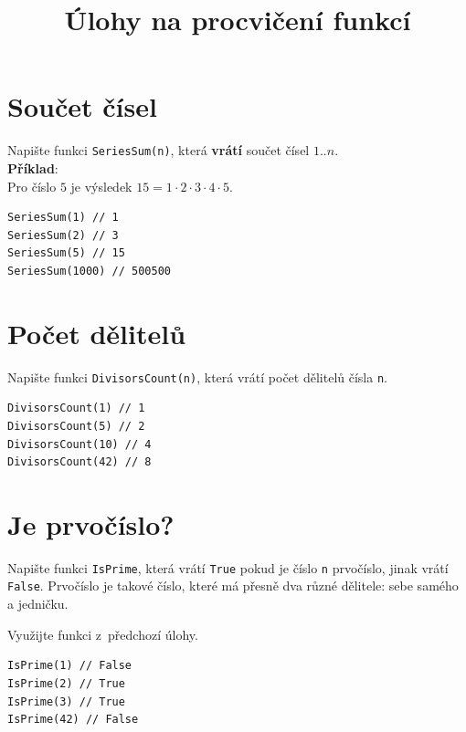 \documentclass[12pt,a4paper]{article}
\begin{document}
\pagestyle{empty}
\title{Úlohy na procvičení funkcí}
\date{\vspace{-10ex}}
\setlength{\droptitle}{-6em}
\maketitle

\setlength\parindent{0pt}

\begin{multicols}{2}

\section{Součet čísel}

Napište funkci \texttt{SeriesSum(n)}, která \textbf{vrátí} součet čísel
$1..n$.\\

\textbf{Příklad}:\\
Pro číslo $5$ je výsledek $15 = 1 \cdot 2 \cdot 3 \cdot 4 \cdot 5$.

\begin{verbatim}
SeriesSum(1) // 1
SeriesSum(2) // 3
SeriesSum(5) // 15
SeriesSum(1000) // 500500
\end{verbatim}

\section{Počet dělitelů}

Napište funkci \texttt{DivisorsCount(n)}, která vrátí počet dělitelů čísla
\texttt{n}.

\begin{verbatim}
DivisorsCount(1) // 1
DivisorsCount(5) // 2
DivisorsCount(10) // 4
DivisorsCount(42) // 8
\end{verbatim}

\section{Je prvočíslo?}

Napište funkci \texttt{IsPrime}, která vrátí \texttt{True} pokud je číslo
\texttt{n} prvočíslo, jinak vrátí \texttt{False}. Prvočíslo je takové číslo,
které má přesně dva různé dělitele: sebe samého a jedničku.

Využijte funkci z~předchozí úlohy.

\begin{verbatim}
IsPrime(1) // False
IsPrime(2) // True
IsPrime(3) // True
IsPrime(42) // False
\end{verbatim}


\end{multicols}
\end{document}
